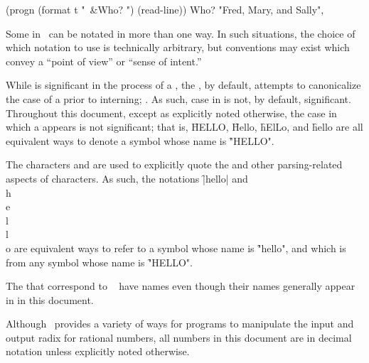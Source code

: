 \code
 (progn (format t "~&Who? ") (read-line))
\OUT Who? 
\EV "Fred, Mary, and Sally", 
\endcode

\endlist

\endsubsubsection%

Some  in \clisp\ can be notated in more than one way.
In such situations, the choice of which notation to use is technically arbitrary,
but conventions may exist which convey a ``point of view'' or ``sense of intent.''


While  is significant in the process of  a ,
the , by default, attempts to canonicalize the case of a
 prior to interning; \seesection\ReadtableCaseReadEffect.
As such, case in  is not, by default, significant.
Throughout this document, except as explicitly noted otherwise,
the case in which a  appears is not significant; 
that is, \f{HELLO}, \f{Hello}, \f{hElLo}, and \f{hello} are
all equivalent ways to denote a symbol whose name is \f{"HELLO"}.

The characters  and  are used to explicitly
quote the  and other parsing-related 
aspects
of characters.  As such,
the notations \f{|hello|} and \f{\\h\\e\\l\\l\\o} are equivalent ways
to refer to a symbol whose name is \f{"hello"}, and which is  from
any symbol whose name is \f{"HELLO"}.

The  that correspond to \clisp\ 
have  names even though their names generally appear
in  in this document.

\endsubsubsubsection%

Although \clisp\ provides a variety of ways for programs to manipulate the
input and output radix for rational numbers, all numbers in this document
are in decimal notation unless explicitly noted otherwise.

